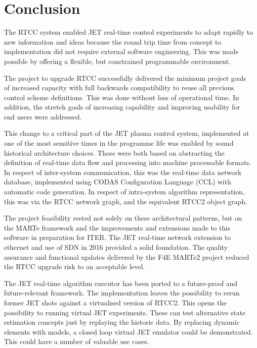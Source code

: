 \documentclass[5p]{elsarticle}
\begin{document}
\section{Conclusion}

The RTCC system enabled JET real-time control experiments to adapt rapidly to new information
and ideas because the round trip time from concept to implementation did not require 
external software engineering. This was made possible by offering a flexible, but 
constrained programmable environment.

The project to upgrade RTCC 
successfully delivered the minimum project goals of increased capacity with
full backwards compatibility to reuse all previous control scheme definitions.
This was done without loss of operational time.
In addition, the stretch goals of increasing capability and improving
usability for end users were addressed.  

This change to a critical part of the JET plasma control system, implemented
at one of the most sensitive times in the programme life was enabled by 
sound historical architecture choices. These were both based on abstracting
the definition of real-time data flow and processing into machine 
processable formats. In respect of inter-system communication, this was the
real-time data network database, implemented using CODAS Configuration Language
(CCL) with automatic code generation.  In respect of intra-system algorithm
representation, this was via the RTCC network graph, and the equivalent RTCC2
object graph.  

The project feasibility rested not solely on these architectural patterns,
but on the MARTe framework and the improvements
and extensions made to this software in preparation for ITER.  
The JET real-time network extension to ethernet and use of SDN in 2016
provided a solid foundation.  The quality assurance and functional updates delivered
by the F4E MARTe2 project reduced the RTCC upgrade risk to an acceptable level.


The JET real-time algorithm executor has been ported to a future-proof and future-relevant framework.
The implementation leaves the possibility to rerun former JET shots against a virtualised
version of RTCC2. This opens the possibility to running virtual JET experiments.
These can test alternative state estimation concepts just by replaying the historic data.
By replacing dynamic elements with models, a closed loop virtual JET emulator could be demonstrated.
This could have a number of valuable use cases.
\end{document}
